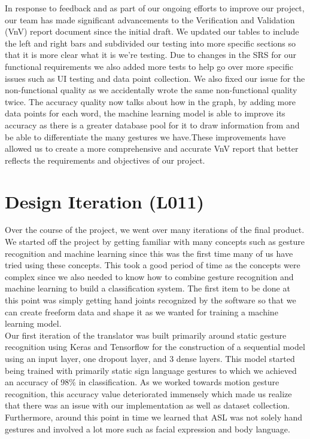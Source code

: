 \documentclass[12pt, titlepage]{article}
\begin{document}
\noindent In response to feedback and as part of our ongoing efforts to improve our project, our team has made significant advancements to the Verification and Validation (VnV) report document since the initial draft. We updated our tables to include the left and right bars and subdivided our testing into more specific sections so that it is more clear what it is we’re testing. Due to changes in the SRS for our functional requirements we also added more tests to help go over more specific issues such as UI testing and data point collection. We also fixed our issue for the non-functional quality as we accidentally wrote the same non-functional quality twice. The accuracy quality now talks about how in the graph, by adding more data points for each word, the machine learning model is able to improve its accuracy as there is a greater database pool for it to draw information from and be able to differentiate the many gestures we have.These improvements have allowed us to create a more comprehensive and accurate VnV report that better reflects the requirements and objectives of our project.\\

\section{Design Iteration (L011)}

Over the course of the project, we went over many iterations of the final product. We started off the project by getting familiar with many concepts such as gesture recognition and machine learning since this was the first time many of us have tried using these concepts. This took a good period of time as the concepts were complex since we also needed to know how to combine gesture recognition and machine learning to build a classification system. The first item to be done at this point was simply getting hand joints recognized by the software so that we can create freeform data and shape it as we wanted for training a machine learning model.\\

\noindent Our first iteration of the translator was built primarily around static gesture recognition using Keras and Tensorflow for the construction of a sequential model using an input layer, one dropout layer, and 3 dense layers. This model started being trained with primarily static sign language gestures to which we achieved an accuracy of 98\% in classification. As we worked towards motion gesture recognition, this accuracy value deteriorated immensely which made us realize that there was an issue with our implementation as well as dataset collection. Furthermore, around this point in time we learned that ASL was not solely hand gestures and involved a lot more such as facial expression and body language. \\
\end{document}
